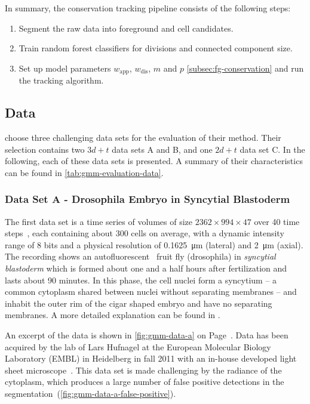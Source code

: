 In summary, the conservation tracking pipeline consists of the following steps:
\begin{enumerate}
      \item Segment the raw data into foreground and cell candidates.
      \item Train random forest classifiers for divisions and connected component size.
      \item Set up model parameters $w_{\text{app}}$, $w_{\text{dis}}$, $m$ and $p$ \cref{subsec:fg-conservation} and run the tracking algorithm.
\end{enumerate}

\subsection{Data}
\label{subsec:gmm-data}
\citet{schiegg_13_conservation} choose three challenging data sets for the evaluation of their
method. Their selection contains two $3d+t$ data sets A and B, and one $2d+t$ data set C. In the
following, each of these data sets is presented. A summary of their characteristics can be found in
\cref{tab:gmm-evaluation-data}.

\subsubsection{Data Set A -  Drosophila Embryo in Syncytial Blastoderm}
The first data set is a time series of volumes of size $2362\times994\times47$ over 40 time
steps~\citep[43]{kausler_13_tracking}, each containing about 300 cells on average, with a dynamic
intensity range of 8 bits and a physical resolution of \SI{0.1625}{\micro\metre} (lateral) and
\SI{2}{\micro\metre} (axial). The recording shows an
autofluorescent~\citep{mavrakis_08_fluorescence} fruit fly (drosophila) in \emph{syncytial
    blastoderm} which is formed about one and a half hours after fertilization and lasts about 90
minutes. In this phase, the cell nuclei form a syncytium -- a common cytoplasm shared between nuclei
without separating membranes -- and inhabit the outer rim of the cigar shaped embryo and have no
separating membranes. A more detailed explanation can be found in \citet{wolpert_07_principles}.

An excerpt of the data is shown in \cref{fig:gmm-data-a} on Page~\pageref{fig:gmm-data-a}. Data has been
acquired by the lab of Lars Hufnagel at the European Molecular Biology Laboratory (EMBL) in
Heidelberg in fall 2011 with an in-house developed light sheet
microscope~\citep{krzic_12_multiview}.  This data set is made challenging by the radiance of the
cytoplasm, which produces a large number of false positive detections in the
segmentation~(\cref{fig:gmm-data-a-false-positive}).

